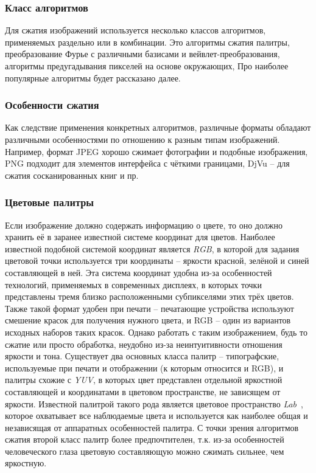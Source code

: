 \documentclass[a4paper,12pt]{article}
\numberwithin{equation}{section}
\begin{document}
\subsubsection{Класс алгоритмов}

Для сжатия изображений используется несколько классов алгоритмов, применяемых
раздельно или в комбинации. Это алгоритмы сжатия палитры, преобразование Фурье с
различными базисами и вейвлет-преобразования, алгоритмы предугадывания
пикселей на основе окружающих, Про наиболее популярные алгоритмы будет
рассказано далее.

\subsubsection{Особенности сжатия}

Как следствие применения конкретных алгоритмов, различные форматы обладают
различными особенностями по отношению к разным типам изображений. Например,
формат JPEG хорошо сжимает фотографии и подобные изображения, PNG подходит для
элементов интерфейса с чёткими границами, DjVu -- для сжатия сосканированных
книг и пр.

\subsubsection{Цветовые палитры}

Если изображение должно содержать информацию о цвете, то оно должно хранить её в
заранее известной системе координат для цветов. Наиболее известной подобной
системой координат является \emph{RGB}, в которой для задания цветовой точки
используется три координаты -- яркости красной, зелёной и синей составляющей в
ней. Эта система координат удобна из-за особенностей технологий, применяемых в
современных дисплеях, в которых точки представлены тремя близко расположенными
субпикселями этих трёх цветов. Также такой формат удобен при печати --
печатающие устройства используют смешение красок для получения нужного цвета, и
RGB -- один из вариантов исходных наборов таких красок. Однако работать с таким
изображением, будь то сжатие или просто обработка, неудобно из-за
неинтуитивности отношения яркости и тона. Существует два основных класса палитр
-- типографские, используемые при печати и отображении (к которым относится и
RGB), и палитры схожие с \emph{YUV}, в которых цвет представлен отдельной
яркостной составляющей и координатами в цветовом пространстве, не зависящем от
яркости. Известной палитрой такого рода является цветовое пространство
\emph{Lab}~\cite{lab}, которое охватывает все наблюдаемые цвета и
используется как наиболее общая и независящая от аппаратных особенностей
палитра. С точки зрения алгоритмов сжатия второй класс палитр более
предпочтителен, т.к. из-за особенностей человеческого глаза цветовую
составляющую можно сжимать сильнее, чем яркостную.
\end{document}
